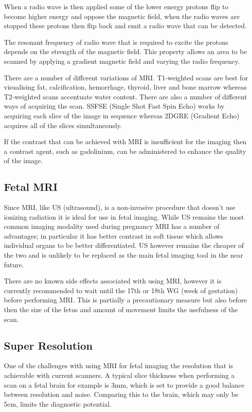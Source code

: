 \documentclass[
  oneside,
  11pt, a4paper,
  footinclude=true,
  headinclude=true,
  cleardoublepage=empty
]{scrbook}
\begin{document}
When a radio wave is then applied some of the lower energy protons flip to become higher energy and oppose the magnetic field, when the radio waves are stopped these protons then flip back and emit a radio wave that can be detected.

The resonant frequency of radio wave that is required to excite the protons depends on the strength of the magnetic field. This property allows an area to be scanned by applying a gradient magnetic field and varying the radio frequency.

There are a number of different variations of MRI. T1-weighted scans are best for visualising fat, calcification, hemorrhage, thyroid, liver and bone marrow whereas T2-weighted scans accentuate water content.
There are also a number of different ways of acquiring the scan. SSFSE (Single Shot Fast Spin Echo) works by acquiring each slice of the image in sequence whereas 2DGRE (Gradient Echo) acquires all of the slices simultaneously.

If the contrast that can be achieved with MRI is insufficient for the imaging then a contrast agent, such as gadolinium, can be administered to enhance the quality of the image.

\subsection{Fetal MRI\cite{fetalmri}}

Since MRI, like US (ultrasound), is a non-invasive procedure that doesn’t use ionizing radiation it is ideal for use in fetal imaging. While US remains the most common imaging modality used during pregnancy MRI has a number of advantages; in particular it has better contrast in soft tissue which allows individual organs to be better differentiated. US however remains the cheaper of the two and is unlikely to be replaced as the main fetal imaging tool in the near future.

There are no known side effects associated with using MRI, however it is currently recommended to wait until the 17th or 18th WG (week of gestation) before performing MRI. This is partially a precautionary measure but also before then the size of the fetus and amount of movement limits the usefulness of the scan.

\subsection{Super Resolution\cite{superresolution1}\cite{superresolution2}}
One of the challenges with using MRI for fetal imaging the resolution that is achievable with current scanners. A typical slice thickness when performing a scan on a fetal brain for example is 3mm, which is set to provide a good balance between resolution and noise. Comparing this to the brain, which may only be 5cm, limits the diagnostic potential.
\end{document}
